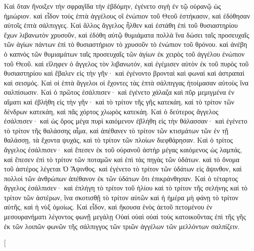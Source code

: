 \begin{pages}
    \begin{Rightside}
        \beginnumbering
		Καὶ ὅταν ἤνοιξεν τὴν σφραγῖδα τὴν ἑβδόμην, ἐγένετο σιγὴ ἐν τῷ οὐρανῷ ὡς ἡμιώριον. καὶ εἶδον τοὺς ἑπτὰ ἀγγέλους οἳ ἐνώπιον τοῦ Θεοῦ ἑστήκασιν, καὶ ἐδόθησαν αὐτοῖς ἑπτὰ σάλπιγγες. Καὶ ἄλλος ἄγγελος ἦλθεν καὶ ἐστάθη ἐπὶ τοῦ θυσιαστηρίου ἔχων λιβανωτὸν χρυσοῦν, καὶ ἐδόθη αὐτῷ θυμιάματα πολλὰ ἵνα δώσει ταῖς προσευχαῖς τῶν ἁγίων πάντων ἐπὶ τὸ θυσιαστήριον τὸ χρυσοῦν τὸ ἐνώπιον τοῦ θρόνου. 
		\pend
		\pstart
		καὶ ἀνέβη ὁ καπνὸς τῶν θυμιαμάτων ταῖς προσευχαῖς τῶν ἁγίων ἐκ χειρὸς τοῦ ἀγγέλου ἐνώπιον τοῦ Θεοῦ. καὶ εἴληφεν ὁ ἄγγελος τὸν λιβανωτόν, καὶ ἐγέμισεν αὐτὸν ἐκ τοῦ πυρὸς τοῦ θυσιαστηρίου καὶ ἔβαλεν εἰς τὴν γῆν· καὶ ἐγένοντο βρονταὶ καὶ φωναὶ καὶ ἀστραπαὶ καὶ σεισμός. Καὶ οἱ ἑπτὰ ἄγγελοι οἱ ἔχοντες τὰς ἑπτὰ σάλπιγγας ἡτοίμασαν αὑτοὺς ἵνα σαλπίσωσιν.
		\pend
		\pstart
		Καὶ ὁ πρῶτος ἐσάλπισεν· καὶ ἐγένετο χάλαζα καὶ πῦρ μεμιγμένα ἐν αἵματι καὶ ἐβλήθη εἰς τὴν γῆν· καὶ τὸ τρίτον τῆς γῆς κατεκάη, καὶ τὸ τρίτον τῶν δένδρων κατεκάη, καὶ πᾶς χόρτος χλωρὸς κατεκάη. 
		\pend
		\pstart
		Καὶ ὁ δεύτερος ἄγγελος ἐσάλπισεν· καὶ ὡς ὄρος μέγα πυρὶ καιόμενον ἐβλήθη εἰς τὴν θάλασσαν· καὶ ἐγένετο τὸ τρίτον τῆς θαλάσσης αἷμα, καὶ ἀπέθανεν τὸ τρίτον τῶν κτισμάτων τῶν ἐν τῇ θαλάσσῃ, τὰ ἔχοντα ψυχάς, καὶ τὸ τρίτον τῶν πλοίων διεφθάρησαν. 
		\pend
		\pstart
		Καὶ ὁ τρίτος ἄγγελος ἐσάλπισεν· καὶ ἔπεσεν ἐκ τοῦ οὐρανοῦ ἀστὴρ μέγας καιόμενος ὡς λαμπάς, καὶ ἔπεσεν ἐπὶ τὸ τρίτον τῶν ποταμῶν καὶ ἐπὶ τὰς πηγὰς τῶν ὑδάτων. καὶ τὸ ὄνομα τοῦ ἀστέρος λέγεται Ὁ Ἄψινθος. καὶ ἐγένετο τὸ τρίτον τῶν ὑδάτων εἰς ἄψινθον, καὶ πολλοὶ τῶν ἀνθρώπων ἀπέθανον ἐκ τῶν ὑδάτων ὅτι ἐπικράνθησαν. 
		\pend
		\pstart
		Καὶ ὁ τέταρτος ἄγγελος ἐσάλπισεν· καὶ ἐπλήγη τὸ τρίτον τοῦ ἡλίου καὶ τὸ τρίτον τῆς σελήνης καὶ τὸ τρίτον τῶν ἀστέρων, ἵνα σκοτισθῇ τὸ τρίτον αὐτῶν καὶ ἡ ἡμέρα μὴ φάνῃ τὸ τρίτον αὐτῆς, καὶ ἡ νὺξ ὁμοίως. Καὶ εἶδον, καὶ ἤκουσα ἑνὸς ἀετοῦ πετομένου ἐν μεσουρανήματι λέγοντος φωνῇ μεγάλῃ Οὐαὶ οὐαὶ οὐαὶ τοὺς κατοικοῦντας ἐπὶ τῆς γῆς ἐκ τῶν λοιπῶν φωνῶν τῆς σάλπιγγος τῶν τριῶν ἀγγέλων τῶν μελλόντων σαλπίζειν.
		\pend
        \endnumbering
    \end{Rightside}
    \begin{Leftside}
        \beginnumbering
        \pstart[

\end{Leftside}
\end{pages}

